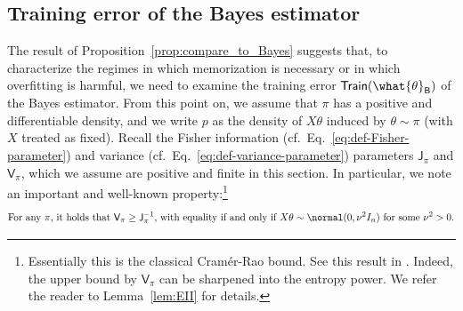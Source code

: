 \documentclass[11pt]{article}
\newcommand{\bysest}{\what{\theta}_{\mathsf{B}}}
\newcommand{\trerr}{\mathsf{Train}}
\newcommand{\jfunc}{\mathsf{J}}
\begin{document}
\subsection{Training error of the Bayes estimator}
The result of Proposition~\ref{prop:compare_to_Bayes} suggests that, to characterize the regimes in which memorization is necessary or in which overfitting is harmful, we need to examine the training error $\trerr(\bysest)$ of the Bayes estimator. From this point on, we assume that $\pi$ has a positive and differentiable density, and we write $p$ as the density of $X\theta$ induced by $\theta\sim \pi$ (with $X$ treated as fixed). Recall the Fisher information (cf.~Eq.~\eqref{eq:def-Fisher-parameter}) and variance (cf.~Eq.~\eqref{eq:def-variance-parameter}) parameters $\jfunc_\pi$ and $\mathsf{V}_\pi$, which we assume are positive and finite in this section.
In particular, we note an important and well-known property:\footnote{Essentially this is the classical Cram\'{e}r-Rao bound. See this result in \cite[Eq.~(2.1)]{stam1959some}. Indeed, the upper bound by $\mathsf{V}_\pi$ can be sharpened into the entropy power. We refer the reader to Lemma~\ref{lem:EII} for details. }
\[\textnormal{For any $\pi$, it holds that $\mathsf{V}_\pi\geq \jfunc_\pi^{-1}$, with equality if and only if $X\theta\sim \normal(0,\nu^2 I_n)$ for some $\nu^2>0$.}\]
\end{document}
